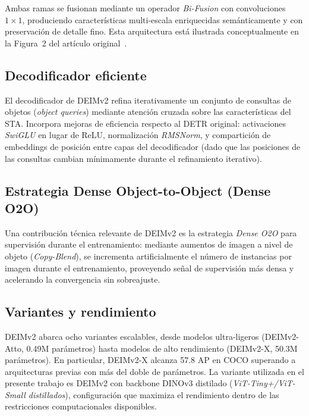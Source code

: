 Ambas ramas se fusionan mediante un operador \textit{Bi-Fusion} con convoluciones $1\times1$, produciendo características multi-escala enriquecidas semánticamente y con preservación de detalle fino. Esta arquitectura está ilustrada conceptualmente en la Figura~2 del artículo original~\cite{huang2025deimv2}.

\subsection{Decodificador eficiente}

El decodificador de DEIMv2 refina iterativamente un conjunto de consultas de objetos (\textit{object queries}) mediante atención cruzada sobre las características del STA. Incorpora mejoras de eficiencia respecto al DETR original: activaciones \textit{SwiGLU} en lugar de ReLU, normalización \textit{RMSNorm}, y compartición de embeddings de posición entre capas del decodificador (dado que las posiciones de las consultas cambian mínimamente durante el refinamiento iterativo).

\subsection{Estrategia Dense Object-to-Object (Dense O2O)}

Una contribución técnica relevante de DEIMv2 es la estrategia \textit{Dense O2O} para supervisión durante el entrenamiento: mediante aumentos de imagen a nivel de objeto (\textit{Copy-Blend}), se incrementa artificialmente el número de instancias por imagen durante el entrenamiento, proveyendo señal de supervisión más densa y acelerando la convergencia sin sobreajuste.

\subsection{Variantes y rendimiento}

DEIMv2 abarca ocho variantes escalables, desde modelos ultra-ligeros (DEIMv2-Atto, 0.49M parámetros) hasta modelos de alto rendimiento (DEIMv2-X, 50.3M parámetros). En particular, DEIMv2-X alcanza 57.8 AP en COCO superando a arquitecturas previas con más del doble de parámetros. La variante utilizada en el presente trabajo es DEIMv2 con backbone DINOv3 distilado (\textit{ViT-Tiny+/ViT-Small distillados}), configuración que maximiza el rendimiento dentro de las restricciones computacionales disponibles.

